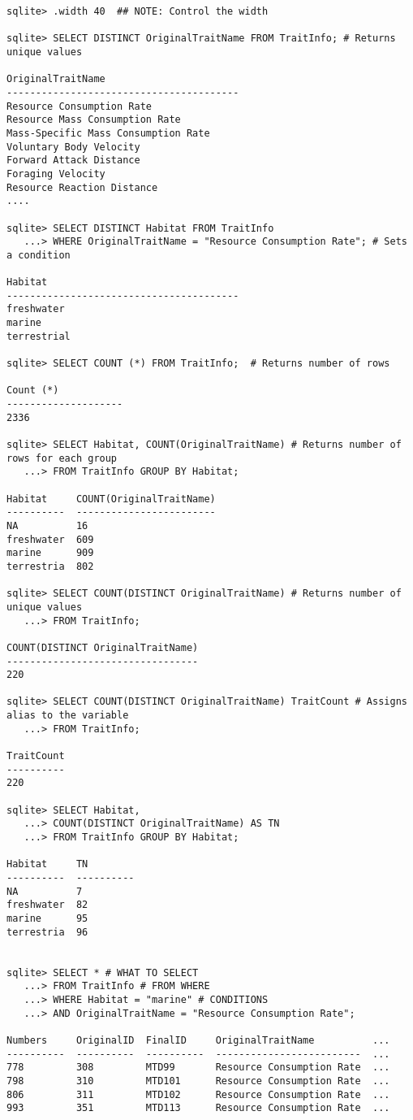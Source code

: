 \begin{lstlisting}
sqlite> .width 40  ## NOTE: Control the width

sqlite> SELECT DISTINCT OriginalTraitName FROM TraitInfo; # Returns unique values

OriginalTraitName                       
----------------------------------------
Resource Consumption Rate               
Resource Mass Consumption Rate          
Mass-Specific Mass Consumption Rate     
Voluntary Body Velocity                 
Forward Attack Distance                 
Foraging Velocity                       
Resource Reaction Distance                   
....

sqlite> SELECT DISTINCT Habitat FROM TraitInfo
   ...> WHERE OriginalTraitName = "Resource Consumption Rate"; # Sets a condition

Habitat                                 
----------------------------------------
freshwater                              
marine                                  
terrestrial 

sqlite> SELECT COUNT (*) FROM TraitInfo;  # Returns number of rows

Count (*)           
--------------------
2336

sqlite> SELECT Habitat, COUNT(OriginalTraitName) # Returns number of rows for each group
   ...> FROM TraitInfo GROUP BY Habitat;

Habitat     COUNT(OriginalTraitName)
----------  ------------------------
NA          16                      
freshwater  609                     
marine      909                     
terrestria  802   

sqlite> SELECT COUNT(DISTINCT OriginalTraitName) # Returns number of unique values
   ...> FROM TraitInfo;

COUNT(DISTINCT OriginalTraitName)
---------------------------------
220   

sqlite> SELECT COUNT(DISTINCT OriginalTraitName) TraitCount # Assigns alias to the variable
   ...> FROM TraitInfo;

TraitCount
----------
220 

sqlite> SELECT Habitat,
   ...> COUNT(DISTINCT OriginalTraitName) AS TN
   ...> FROM TraitInfo GROUP BY Habitat;

Habitat     TN        
----------  ----------
NA          7         
freshwater  82        
marine      95        
terrestria  96     


sqlite> SELECT * # WHAT TO SELECT
   ...> FROM TraitInfo # FROM WHERE
   ...> WHERE Habitat = "marine" # CONDITIONS
   ...> AND OriginalTraitName = "Resource Consumption Rate";

Numbers     OriginalID  FinalID     OriginalTraitName          ...
----------  ----------  ----------  -------------------------  ...
778         308         MTD99       Resource Consumption Rate  ...
798         310         MTD101      Resource Consumption Rate  ...
806         311         MTD102      Resource Consumption Rate  ...
993         351         MTD113      Resource Consumption Rate  ...

\end{lstlisting}

